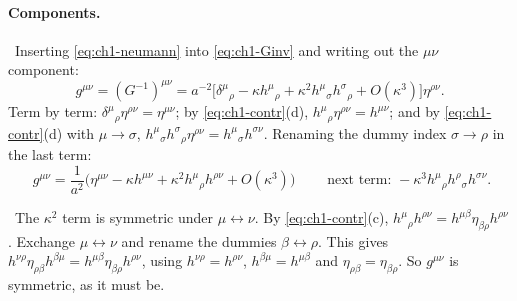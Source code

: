 \paragraph{Components.} \tD\ Inserting \eqref{eq:ch1-neumann} into
\eqref{eq:ch1-Ginv} and writing out the $\mu\nu$ component:
\begin{equation}
g^{\mu\nu}=(G^{-1})^{\mu\nu}=a^{-2}\big[\delta^\mu{}_\rho-\kappa h^\mu{}_\rho+\kappa^2h^\mu{}_\sigma h^\sigma{}_\rho+O(\kappa^3)\big]\eta^{\rho\nu}.
\label{eq:ch1-ginv-comp}
\end{equation}
Term by term: $\delta^\mu{}_\rho\eta^{\rho\nu}=\eta^{\mu\nu}$; by
\eqref{eq:ch1-contr}(d), $h^\mu{}_\rho\eta^{\rho\nu}=h^{\mu\nu}$; and by
\eqref{eq:ch1-contr}(d) with $\mu\to\sigma$,
$h^\mu{}_\sigma h^\sigma{}_\rho\eta^{\rho\nu}=h^\mu{}_\sigma h^{\sigma\nu}$.
Renaming the dummy index $\sigma\to\rho$ in the last term:
\begin{equation*}
\boxed{\;g^{\mu\nu}=\frac{1}{a^2}\Big(\eta^{\mu\nu}-\kappa h^{\mu\nu}+\kappa^2h^\mu{}_\rho h^{\rho\nu}+O(\kappa^3)\Big)\;}
\qquad\text{next term: }-\kappa^3h^\mu{}_\rho h^\rho{}_\sigma h^{\sigma\nu}.
\tag{I.4}\label{eq:ch1-ginv}
\end{equation*}

\noindent\tD\ The $\kappa^2$ term is symmetric under $\mu\leftrightarrow\nu$.
By \eqref{eq:ch1-contr}(c),
$h^\mu{}_\rho h^{\rho\nu}=h^{\mu\beta}\eta_{\beta\rho}h^{\rho\nu}$. Exchange
$\mu\leftrightarrow\nu$ and rename the dummies $\beta\leftrightarrow\rho$. This
gives $h^{\nu\rho}\eta_{\rho\beta}h^{\beta\mu}=h^{\mu\beta}\eta_{\beta\rho}h^{\rho\nu}$,
using $h^{\nu\rho}=h^{\rho\nu}$, $h^{\beta\mu}=h^{\mu\beta}$ and
$\eta_{\rho\beta}=\eta_{\beta\rho}$. So $g^{\mu\nu}$ is symmetric, as it must be.

